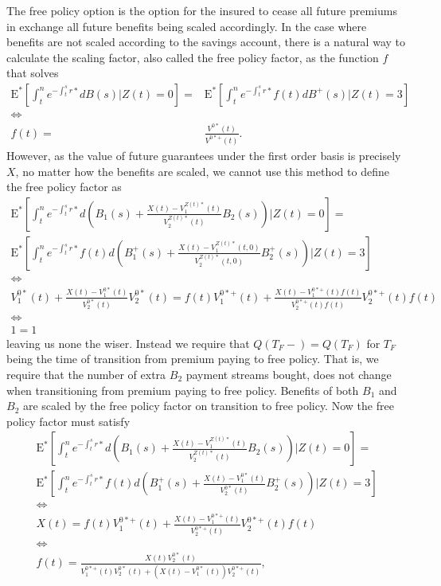 \documentclass[12pt]{article}
\newcommand{\E}{\text{E}}
\theoremstyle{my_thm}
\begin{document}
The free policy option is the option for the insured to cease all future premiums in exchange all future benefits being scaled accordingly. In the case where benefits are not scaled according to the savings account, there is a natural way to calculate the scaling factor, also called the free policy factor, as the function $f$ that solves
\begin{align*}
\E^* \left[ \int_t^n e^{-\int_t^s r*} dB(s)|Z(t)=0 \right]
=&\E^* \left[ \int_t^n e^{-\int_t^s r*} f(t) dB^+(s)|Z(t)=3 \right]
\\
\Leftrightarrow&
\\
f(t)=&\frac{V^{0*}(t)}{V^{0*+}(t)}.
\end{align*}
However, as the value of future guarantees under the first order basis is precisely $X$, no matter how the benefits are scaled, we cannot use this method to define the free policy factor as
\begin{gather*}
\E^* \left[ \int_t^n e^{-\int_t^s r*} d \left( B_1(s)+\frac{X(t)-V_1^{Z(t)*}(t)}{V_2^{Z(t)*}(t)}B_2(s) \right) |Z(t)=0 \right]
=
\\
\E^* \left[ \int_t^n e^{-\int_t^s r*} f(t) d \left( B_1^+(s)+\frac{X(t)-V_1^{Z(t)*}(t,0)}{V_2^{Z(t)*}(t,0)}B_2^+(s) \right) |Z(t)=3 \right]
\\
\Leftrightarrow
\\
V_1^{0*}(t)+ \frac{X(t)-V_1^{0*}(t)}{V_2^{0*}(t)}V_2^{0*}(t)
=
f(t)V_1^{0*+}(t)+ \frac{X(t)-V_1^{0*+}(t)f(t)}{V_2^{0*+}(t)f(t)}V_2^{0*+}(t)f(t)
\\
 \Leftrightarrow
\\
1=1
\end{gather*}
leaving us none the wiser. Instead we require that $Q(T_F-)=Q(T_F)$ for $T_F$ being the time of transition from premium paying to free policy. That is, we require that the number of extra $B_2$ payment streams bought, does not change when transitioning from premium paying to free policy. Benefits of both $B_1$ and $B_2$ are scaled by the free policy factor on transition to free policy. Now the free policy factor must satisfy
\begin{gather*}
\E^* \left[ \int_t^n e^{-\int_t^s r*} d \left( B_1(s)+\frac{X(t)-V_1^{Z(t)*}(t)}{V_2^{Z(t)*}(t)}B_2(s) \right) |Z(t)=0 \right]
=
\\
\E^* \left[ \int_t^n e^{-\int_t^s r*} f(t) d \left( B_1^+(s)+\frac{X(t)-V_1^{0*}(t)}{V_2^{0*}(t)}B_2^+(s) \right) |Z(t)=3 \right]
\\
\Leftrightarrow
\\
X(t)
=
f(t)V_1^{0*+}(t)+ \frac{X(t)-V_1^{0*+}(t)}{V_2^{0*+}(t)}V_2^{0*+}(t)f(t)
\\
\Leftrightarrow
\\
f(t)=\frac{X(t)V_2^{0*}(t)}{V_1^{0*+}(t)V_2^{0*}(t)+(X(t)-V_1^{0*}(t))V_2^{0*+}(t)},
\end{gather*}
\end{document}
